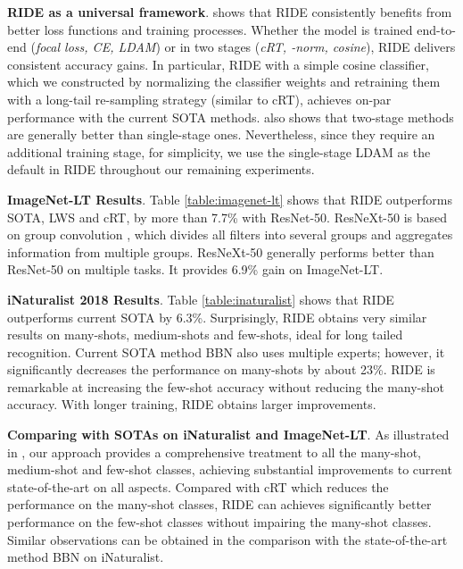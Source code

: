 
{\bf{RIDE as a universal framework}}.  shows that RIDE consistently benefits from better loss functions and training processes.  Whether the model is trained end-to-end ({\it focal loss, CE, LDAM}) or in two stages ({\it cRT, -norm, cosine}), RIDE delivers consistent accuracy gains.
In particular, RIDE with a simple cosine classifier, which we constructed by normalizing the classifier weights and retraining them with a long-tail re-sampling strategy (similar to cRT), achieves on-par performance with the current SOTA methods.  
 also shows that two-stage methods are generally better than single-stage ones.  Nevertheless, since they require an additional training stage, for simplicity, we use  the single-stage LDAM as the default  in RIDE throughout our remaining experiments.


{\bf{ImageNet-LT Results}}.  Table \ref{table:imagenet-lt} shows that  RIDE outperforms SOTA, LWS and cRT, by more than 7.7\% with ResNet-50.  ResNeXt-50 is based on group convolution \citep{xie2017aggregated}, which divides all filters into several groups and aggregates information from multiple groups.  ResNeXt-50 generally performs better than ResNet-50 on multiple tasks.  It provides 6.9\% gain on ImageNet-LT.


{\bf{iNaturalist 2018 Results}}.  Table \ref{table:inaturalist} shows that RIDE outperforms current SOTA by 6.3\%. Surprisingly, RIDE obtains very similar results on many-shots, medium-shots and few-shots, ideal for long tailed recognition.  Current SOTA method BBN also uses multiple experts; however, it significantly decreases the performance on many-shots by about 23\%.   RIDE is remarkable at increasing the few-shot accuracy without reducing the many-shot accuracy. With longer training, RIDE obtains larger improvements.

{\bf{Comparing with SOTAs on iNaturalist and ImageNet-LT}}. As illustrated in , our approach provides a comprehensive treatment to all the many-shot, medium-shot and few-shot classes, achieving substantial improvements to current state-of-the-art on all aspects. Compared with cRT which reduces the performance on the many-shot classes, RIDE can achieves significantly better performance on the few-shot classes without impairing the many-shot classes. Similar observations can be obtained in the comparison with the state-of-the-art method BBN \citep{zhou2020bbn} on iNaturalist.

